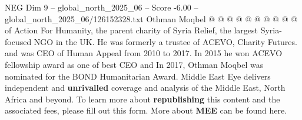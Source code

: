 \begin{textsample}{NEG Dim 9 – global\_north\_2025\_06 – Score -6.00 – global\_north\_2025\_06/126152328.txt}
Othman Moqbel @ @ @ @ @ @ @ @ @ @ of Action For Humanity, the parent charity of Syria Relief, the largest Syria-focused NGO in the UK.
He was formerly a trustee of ACEVO, Charity Futures. and was CEO of Human Appeal from 2010 to 2017.
In 2015 he won ACEVO fellowship award as one of best CEO and In 2017, Othman Moqbel was nominated for the BOND Humanitarian Award.
Middle East Eye delivers independent and \textbf{unrivalled} coverage and analysis of the Middle East, North Africa and beyond.
To learn more about \textbf{republishing} this content and the associated fees, please fill out this form.
More about \textbf{MEE} can be found here.

\end{textsample}
